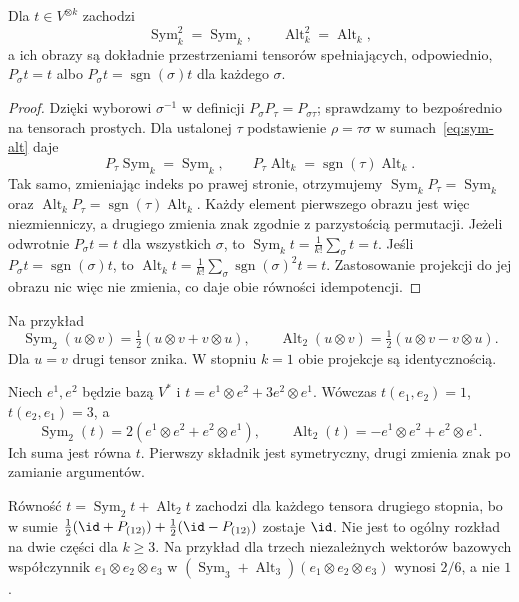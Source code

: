 \begin{twierdzenie}
\label{thm:sym-alt}
Dla $t\in V^{\otimes k}$ zachodzi
\[
 \operatorname{Sym}_k^2=\operatorname{Sym}_k,\qquad
 \operatorname{Alt}_k^2=\operatorname{Alt}_k,
\]
a ich obrazy są dokładnie przestrzeniami tensorów spełniających,
odpowiednio, $P_\sigma t=t$ albo
$P_\sigma t=\operatorname{sgn}(\sigma)t$ dla każdego $\sigma$.
\end{twierdzenie}
\begin{proof}
Dzięki wyborowi $\sigma^{-1}$ w definicji
$P_\sigma P_\tau=P_{\sigma\tau}$; sprawdzamy to bezpośrednio
na tensorach prostych. Dla ustalonej $\tau$ podstawienie
$\rho=\tau\sigma$ w sumach~\eqref{eq:sym-alt} daje
\[
 P_\tau\operatorname{Sym}_k=\operatorname{Sym}_k,
 \qquad
 P_\tau\operatorname{Alt}_k
 =\operatorname{sgn}(\tau)\operatorname{Alt}_k.
\]
Tak samo, zmieniając indeks po prawej stronie, otrzymujemy
$\operatorname{Sym}_kP_\tau=\operatorname{Sym}_k$ oraz
$\operatorname{Alt}_kP_\tau=\operatorname{sgn}(\tau)\operatorname{Alt}_k$.
Każdy element pierwszego obrazu jest więc niezmienniczy,
a drugiego zmienia znak zgodnie z parzystością permutacji.
Jeżeli odwrotnie $P_\sigma t=t$ dla wszystkich $\sigma$,
to $\operatorname{Sym}_k t=\frac1{k!}\sum_\sigma t=t$.
Jeśli $P_\sigma t=\operatorname{sgn}(\sigma)t$, to
$\operatorname{Alt}_k t=
\frac1{k!}\sum_\sigma\operatorname{sgn}(\sigma)^2t=t$.
Zastosowanie projekcji do jej obrazu nic więc nie zmienia,
co daje obie równości idempotencji.
\end{proof}

Na przykład
\[
 \operatorname{Sym}_2(u\otimes v)
 =\tfrac12(u\otimes v+v\otimes u),\qquad
 \operatorname{Alt}_2(u\otimes v)
 =\tfrac12(u\otimes v-v\otimes u).
\]
Dla $u=v$ drugi tensor znika. W stopniu $k=1$ obie
projekcje są identycznością.

\begin{przyklad}
Niech $e^1,e^2$ będzie bazą $V^*$ i
$t=e^1\otimes e^2+3e^2\otimes e^1$.
Wówczas $t(e_1,e_2)=1$, $t(e_2,e_1)=3$, a
\[
 \operatorname{Sym}_2(t)
 =2(e^1\otimes e^2+e^2\otimes e^1),\qquad
 \operatorname{Alt}_2(t)
 =-e^1\otimes e^2+e^2\otimes e^1.
\]
Ich suma jest równa $t$. Pierwszy składnik jest symetryczny,
drugi zmienia znak po zamianie argumentów.
\end{przyklad}

Równość $t=\operatorname{Sym}_2t+\operatorname{Alt}_2t$
zachodzi dla każdego tensora drugiego stopnia, bo w sumie
$\tfrac12(\id+P_{(12)})+\tfrac12(\id-P_{(12)})$ zostaje $\id$.
Nie jest to ogólny rozkład na dwie części dla $k\geq3$.
Na przykład dla trzech niezależnych wektorów bazowych
współczynnik $e_1\otimes e_2\otimes e_3$ w
$(\operatorname{Sym}_3+\operatorname{Alt}_3)
(e_1\otimes e_2\otimes e_3)$ wynosi $2/6$, a nie $1$.

